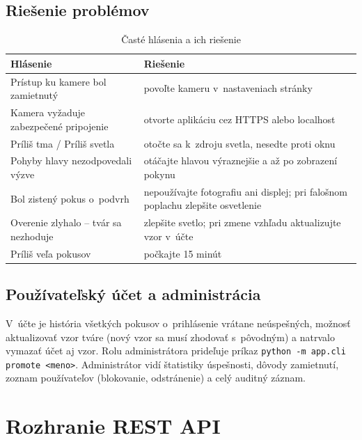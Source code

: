 \subsection*{Riešenie problémov}
\begin{table}[H]
  \centering
  \caption{Časté hlásenia a ich riešenie}
  \label{tab:hlasenia}
  \small
  \begin{tabularx}{\textwidth}{@{}>{\raggedright\arraybackslash}p{5.5cm} X@{}}
    \toprule
    Hlásenie & Riešenie \\
    \midrule
    Prístup ku kamere bol zamietnutý & povoľte kameru v~nastaveniach stránky \\
    Kamera vyžaduje zabezpečené pripojenie & otvorte aplikáciu cez HTTPS alebo localhost \\
    Príliš tma / Príliš svetla & otočte sa k~zdroju svetla, nesedte proti oknu \\
    Pohyby hlavy nezodpovedali výzve & otáčajte hlavou výraznejšie a až po zobrazení pokynu \\
    Bol zistený pokus o~podvrh & nepoužívajte fotografiu ani displej; pri falošnom poplachu zlepšite osvetlenie \\
    Overenie zlyhalo -- tvár sa nezhoduje & zlepšite svetlo; pri zmene vzhľadu aktualizujte vzor v~účte \\
    Príliš veľa pokusov & počkajte 15 minút \\
    \bottomrule
  \end{tabularx}
\end{table}

\subsection*{Používateľský účet a administrácia}
V~účte je história všetkých pokusov o~prihlásenie vrátane neúspešných, možnosť
aktualizovať vzor tváre (nový vzor sa musí zhodovať s~pôvodným) a natrvalo vymazať
účet aj vzor. Rolu administrátora prideľuje príkaz
\texttt{python -m app.cli promote <meno>}. Administrátor vidí štatistiky úspešnosti,
dôvody zamietnutí, zoznam používateľov (blokovanie, odstránenie) a celý auditný záznam.

\section{Rozhranie REST API}

